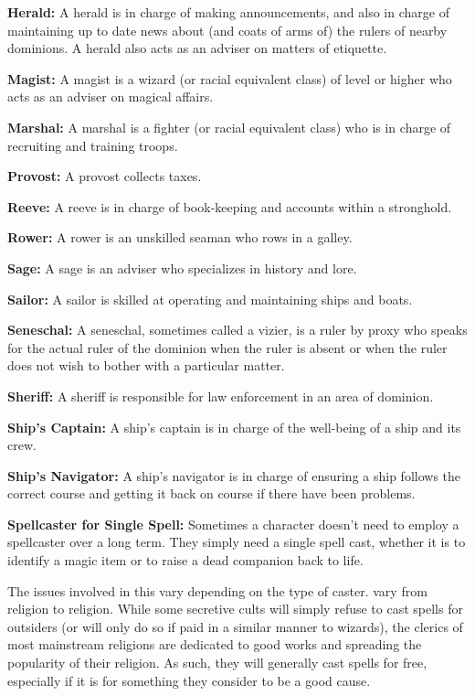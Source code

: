 \begin{multicols*}{2}
\textbf{Herald:} A herald is in charge of making announcements, and also in charge of maintaining up to date news about (and coats of arms of) the rulers of nearby dominions. A herald also acts as an adviser on matters of etiquette.

\textbf{Magist:} A magist is a wizard (or racial equivalent class) of  level or higher who acts as an adviser on magical affairs.

\textbf{Marshal:} A marshal is a fighter (or racial equivalent class) who is in charge of recruiting and training troops.

\textbf{Provost:} A provost collects taxes.

\textbf{Reeve:} A reeve is in charge of book-keeping and accounts within a stronghold.

\textbf{Rower:} A rower is an unskilled seaman who rows in a galley.

\textbf{Sage:} A sage is an adviser who specializes in history and lore.

\textbf{Sailor:} A sailor is skilled at operating and maintaining ships and boats.

\textbf{Seneschal:} A seneschal, sometimes called a vizier, is a ruler by proxy who speaks for the actual ruler of the dominion when the ruler is absent or when the ruler does not wish to bother with a particular matter.

\textbf{Sheriff:} A sheriff is responsible for law enforcement in an area of dominion.

\textbf{Ship’s Captain:} A ship’s captain is in charge of the well-being of a ship and its crew.

\textbf{Ship’s Navigator:} A ship’s navigator is in charge of ensuring a ship follows the correct course and getting it back on course if there have been problems.

\textbf{Spellcaster for Single Spell:} Sometimes a character doesn’t need to employ a spellcaster over a long term. They simply need a single spell cast, whether it is to identify a magic item or to raise a dead companion back to life.

The issues involved in this vary depending on the type of caster.  vary from religion to religion. While some secretive cults will simply refuse to cast spells for outsiders (or will only do so if paid in a similar manner to wizards), the clerics of most mainstream religions are dedicated to good works and spreading the popularity of their religion. As such, they will generally cast spells for free, especially if it is for something they consider to be a good cause.


\end{multicols*}

